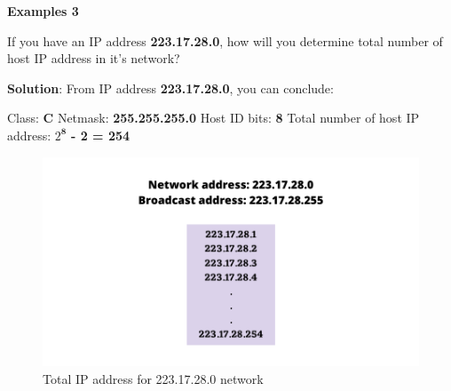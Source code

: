 \begin{flushleft}
\newpage
\textbf{Examples 3}

If you have an IP address \textbf{223.17.28.0}, how will you determine total number of host IP address in it's network?	

\textbf{Solution}: From IP address \textbf{223.17.28.0}, you can conclude:
\begin{tcolorbox}[breakable,notitle,boxrule=-0pt,colback=pink,colframe=pink]
	\color{black}
	Class: \textbf{C}
	\newline
	Netmask: \textbf{255.255.255.0}
	\newline
	Host ID bits: \textbf{8}
	\newline
	Total number of host IP address: \textbf{$2^\textbf{8}$} \textbf{- 2 = 254}
\end{tcolorbox}	

\begin{figure}[h!]
	\centering
	\includegraphics[scale=.7]{content/chapter14/images/calculation3.png}
	\caption{Total IP address for 223.17.28.0 network}
	\label{fig:network1}
\end{figure}	

\end{flushleft}
\newpage
